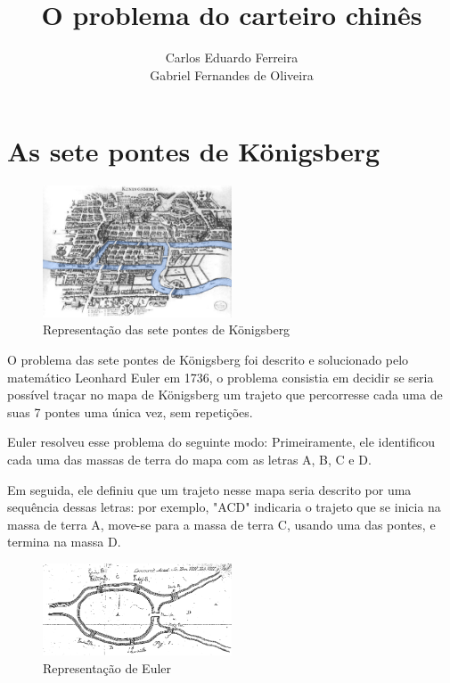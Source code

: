 \documentclass{article}
\title{O problema do carteiro chinês}
\author{Carlos Eduardo Ferreira\\Gabriel Fernandes de Oliveira}
\date{}
\begin{document}
\maketitle

\section{As sete pontes de Königsberg}

\begin{figure} 
    \centering
    \includegraphics[width=0.5\textwidth]{konigsberg.png}
    \caption{Representação das sete pontes de Königsberg}
\end{figure}

O problema das sete pontes de Königsberg foi descrito e solucionado pelo matemático Leonhard Euler em 1736, o problema consistia em decidir se seria possível traçar no mapa de Königsberg um trajeto que percorresse cada uma de suas 7 pontes uma única vez, sem repetições.

Euler resolveu esse problema do seguinte modo: 
Primeiramente, ele identificou cada uma das massas de terra do mapa com as letras A, B, C e D.

Em seguida, ele definiu que um trajeto nesse mapa seria descrito por uma sequência dessas letras: por exemplo, "ACD" indicaria o trajeto que se inicia na massa de terra A, move-se para a massa de terra C, usando uma das pontes, e termina na massa D.

\begin{figure} 
    \centering
    \includegraphics[width=0.5\textwidth]{konigsberg-euler.png}
    \caption{Representação de Euler}
	\label{konigsberg-euler}
\end{figure}
\end{document}
